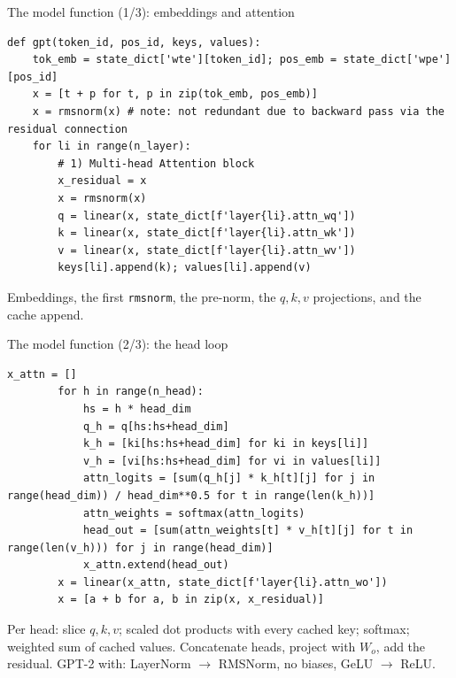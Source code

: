 \documentclass[aspectratio=169,11pt]{beamer}
\begin{document}
\begin{frame}[fragile]{The model function (1/3): embeddings and attention}
\begin{lstlisting}[basicstyle=\ttfamily\tiny]
def gpt(token_id, pos_id, keys, values):
    tok_emb = state_dict['wte'][token_id]; pos_emb = state_dict['wpe'][pos_id]
    x = [t + p for t, p in zip(tok_emb, pos_emb)]
    x = rmsnorm(x) # note: not redundant due to backward pass via the residual connection
    for li in range(n_layer):
        # 1) Multi-head Attention block
        x_residual = x
        x = rmsnorm(x)
        q = linear(x, state_dict[f'layer{li}.attn_wq'])
        k = linear(x, state_dict[f'layer{li}.attn_wk'])
        v = linear(x, state_dict[f'layer{li}.attn_wv'])
        keys[li].append(k); values[li].append(v)
\end{lstlisting}
Embeddings, the first \texttt{rmsnorm}, the pre-norm, the $q,k,v$ projections, and the cache append.
\end{frame}

\begin{frame}[fragile]{The model function (2/3): the head loop}
\begin{lstlisting}[basicstyle=\ttfamily\tiny]
        x_attn = []
        for h in range(n_head):
            hs = h * head_dim
            q_h = q[hs:hs+head_dim]
            k_h = [ki[hs:hs+head_dim] for ki in keys[li]]
            v_h = [vi[hs:hs+head_dim] for vi in values[li]]
            attn_logits = [sum(q_h[j] * k_h[t][j] for j in range(head_dim)) / head_dim**0.5 for t in range(len(k_h))]
            attn_weights = softmax(attn_logits)
            head_out = [sum(attn_weights[t] * v_h[t][j] for t in range(len(v_h))) for j in range(head_dim)]
            x_attn.extend(head_out)
        x = linear(x_attn, state_dict[f'layer{li}.attn_wo'])
        x = [a + b for a, b in zip(x, x_residual)]
\end{lstlisting}
Per head: slice $q,k,v$; scaled dot products with every cached key; softmax; weighted sum of cached values. Concatenate heads, project with $W_o$, add the residual.
GPT-2 \parencite{radford2019gpt2} with: LayerNorm $\to$ RMSNorm, no biases, GeLU $\to$ ReLU.
\end{frame}
\end{document}
